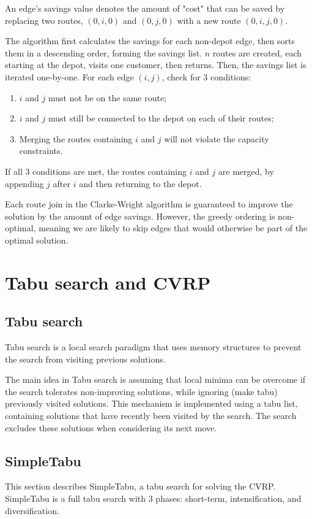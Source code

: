 \documentclass[12pt]{report}
\begin{document}
An edge's savings value denotes the amount of "cost" that can be saved by replacing two routes, $(0, i, 0)$ and $(0, j, 0)$ with a new route $(0, i, j, 0)$.

The algorithm first calculates the savings for each non-depot edge, then sorts them in a descending order, forming the savings list. $n$ routes are created, each starting at the depot, visits one customer, then returns. Then, the savings list is iterated one-by-one. For each edge $(i, j)$, check for 3 conditions:
\begin{enumerate}
	\item $i$ and $j$ must not be on the same route;
	\item $i$ and $j$ must still be connected to the depot on each of their routes;
	\item Merging the routes containing $i$ and $j$ will not violate the capacity constraints.
\end{enumerate}

If all 3 conditions are met, the routes containing $i$ and $j$ are merged, by appending $j$ after $i$ and then returning to the depot.

Each route join in the Clarke-Wright algorithm is guaranteed to improve the solution by the amount of edge savings. However, the greedy ordering is non-optimal, meaning we are likely to skip edges that would otherwise be part of the optimal solution.

\chapter{Tabu search and CVRP}
\section{Tabu search}
Tabu search \cite{glover1986future} is a local search paradigm that uses memory structures to prevent the search from visiting previous solutions.

The main idea in Tabu search is assuming that local minima can be overcome if the search tolerates non-improving solutions, while ignoring (make tabu) previously visited solutions. This mechanism is implemented using a tabu list, containing solutions that have recently been visited by the search. The search excludes these solutions when considering its next move.

\section{SimpleTabu}
This section describes SimpleTabu, a tabu search for solving the CVRP. SimpleTabu is a full tabu search with 3 phases: short-term, intensification, and diversification.
\end{document}
